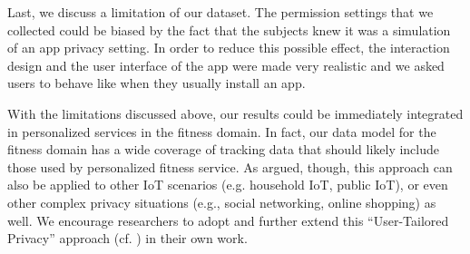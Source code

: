 Last, we discuss a limitation of our dataset. The permission settings that we collected could be biased by the fact that the subjects knew it was a simulation of an app privacy setting. In order to reduce this possible effect, the interaction design and the user interface  of the app were made very realistic and we asked users to behave like when they usually install an app.

With the limitations discussed above, our results could be immediately integrated in personalized services in the fitness domain. In fact, our data model for the fitness domain has a wide coverage of tracking data that should likely include those used by personalized fitness service.
As argued, though, this approach can also be applied to other IoT scenarios (e.g. household IoT, public IoT), or even other complex privacy situations (e.g., social networking, online shopping) as well. We encourage researchers to adopt and further extend this ``User-Tailored Privacy'' approach (cf. \cite{knijnenburg2017privacy}) in their own work.
